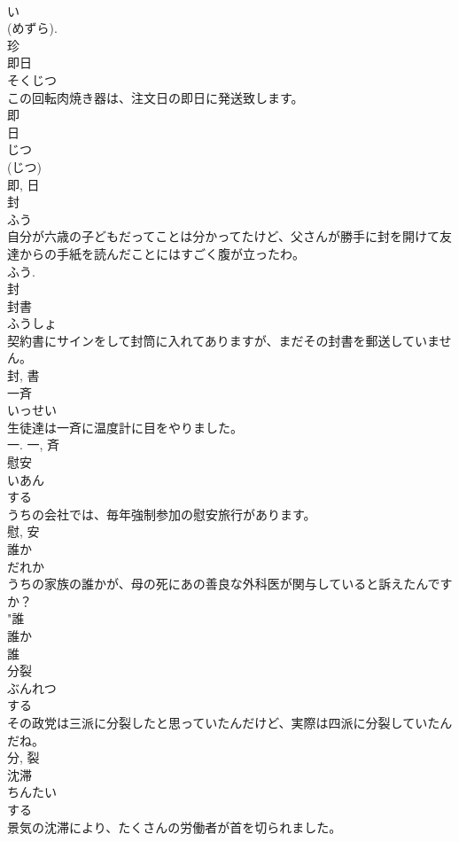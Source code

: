 \documentclass[8pt]{extreport}
\begin{document}
\begin{CJK}{UTF8}{min}
\\	い 
\\	(めずら). 
\\	珍	
\\	即日	
\\	そくじつ	
\\	この回転肉焼き器は、注文日の即日に発送致します。	
\\	即 
\\	日 
\\	じつ 
\\	(じつ) 
\\	即, 日	
\\	封	
\\	ふう	
\\	自分が六歳の子どもだってことは分かってたけど、父さんが勝手に封を開けて友達からの手紙を読んだことにはすごく腹が立ったわ。	
\\	ふう. 
\\	封	
\\	封書	
\\	ふうしょ	
\\	契約書にサインをして封筒に入れてありますが、まだその封書を郵送していません。	
\\	封, 書	
\\	一斉	
\\	いっせい	
\\	生徒達は一斉に温度計に目をやりました。	
\\	一.	一, 斉	
\\	慰安	
\\	いあん	
\\	する 
\\	うちの会社では、毎年強制参加の慰安旅行があります。	
\\	慰, 安	
\\	誰か	
\\	だれか	
\\	うちの家族の誰かが、母の死にあの善良な外科医が関与していると訴えたんですか？	
\\	"誰 
\\	誰か 
\\	誰	
\\	分裂	
\\	ぶんれつ	
\\	する 
\\	その政党は三派に分裂したと思っていたんだけど、実際は四派に分裂していたんだね。	
\\	分, 裂	
\\	沈滞	
\\	ちんたい	
\\	する 
\\	景気の沈滞により、たくさんの労働者が首を切られました。	

\end{CJK}
\end{document}
